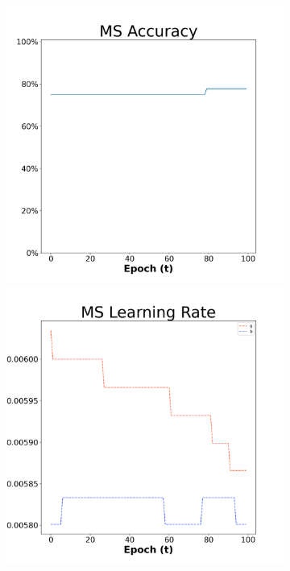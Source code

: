 \begin{figure}[H]
    \centering %
\begin{subfigure}{0.3\textwidth}
  \includegraphics[width=\linewidth]{images/exper1/Ionosphere/MS_0.01_acc.png}
    \includegraphics[width=\linewidth]{images/exper1/Ionosphere/MS_0.01_lr.png}

\end{subfigure}
\end{figure}
